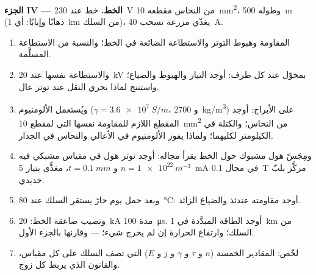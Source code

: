 \begin{problem}
\medskip
\noindent\textbf{الجزء IV --- الخط.}
خط عند \qty{230}{V} من النحاس مقطعه \qty{10}{mm^2}، وطوله \qty{500}{m} (ذهابًا وإيابًا:
أي \qty{1}{km} من السلك)، يغذّي مزرعة تسحب \qty{40}{A}.
\begin{enumerate}[resume]
  \item المقاومة وهبوط التوتر والاستطاعة الضائعة في الخط؛ والنسبة
        من الاستطاعة المسلَّمة.
  \item والاستطاعة نفسها عند \qty{20}{kV} بمحوّل عند كل طرف: أوجد
        التيار والهبوط والضياع؛ واستنتج لماذا يجري النقل عند
        توتر عال.
  \item ويُستعمل الألومنيوم ($\gamma = \qty{3.6e7}{S/m}$، و \qty{2700}{kg/m^3}) على
        الأبراج: أوجد المقطع اللازم للمقاومة نفسها التي لمقطع \qty{10}{mm^2} من
        النحاس؛ والكتلة في الكيلومتر لكليهما؛ ولماذا يفوز الألومنيوم
        في الأعالي والنحاس في الجدار.
  \item ومِجَسّ هول مشبوك حول الخط يقرأ مجاله: أوجد توتر هول
        في مقياس مشبكي فيه $n = \qty{1e22}{m^{-3}}$ و $t = \qty{0.1}{mm}$، مغذًّى بتيار
        \qty{5}{mA} في مجال \qty{0.1}{T} مركَّز بلبّ حديدي.
  \item وبعد حمل يوم حارّ يستقر السلك عند \qty{80}{\degreeCelsius}:
        أوجد مقاومته عندئذ والضياع الزائد.
  \item وتصيب صاعقة الخط: \qty{20}{kA} مدة \qty{100}{\micro s}. أوجد الطاقة
        المبدَّدة في \qty{1}{km} من السلك؛ وارتفاع الحرارة إن لم يخرج
        شيء؛  --- وقارنها بالجزء الأول.
  \item لخّص: المقادير الخمسة ($n$ و $\tau$ و $\gamma$ و $j$ و $E$) التي
        تصف السلك على كل مقياس، والقانون الذي يربط كل زوج.
\end{enumerate}
\end{problem}
